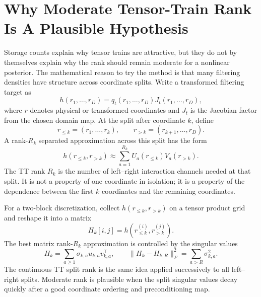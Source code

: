 \documentclass[11pt]{article}
\numberwithin{equation}{section}
\begin{document}
\section{Why Moderate Tensor-Train Rank Is A Plausible Hypothesis}

Storage counts explain why tensor trains are attractive, but they do not by
themselves explain why the rank should remain moderate for a nonlinear
posterior.  The mathematical reason to try the method is that many filtering
densities have structure across coordinate splits.  Write a transformed
filtering target as
\begin{equation}
    h(r_1,\ldots,r_D)
    =
    q_t(r_1,\ldots,r_D)
    J_t(r_1,\ldots,r_D),
    \label{eq:p24-rank-h}
\end{equation}
where \(r\) denotes physical or transformed coordinates and \(J_t\) is the
Jacobian factor from the chosen domain map.  At the split after coordinate
\(k\), define
\begin{equation}
    r_{\le k}=(r_1,\ldots,r_k),\qquad
    r_{>k}=(r_{k+1},\ldots,r_D).
    \label{eq:p24-rank-split}
\end{equation}
A rank-\(R_k\) separated approximation across this split has the form
\begin{equation}
    h(r_{\le k},r_{>k})
    \approx
    \sum_{a=1}^{R_k}
    U_a(r_{\le k})V_a(r_{>k}).
    \label{eq:p24-rank-separated}
\end{equation}
The TT rank \(R_k\) is the number of left--right interaction channels needed
at that split.  It is not a property of one coordinate in isolation; it is a
property of the dependence between the first \(k\) coordinates and the
remaining coordinates.

For a two-block discretization, collect \(h(r_{\le k},r_{>k})\) on a tensor
product grid and reshape it into a matrix
\begin{equation}
    H_k[i,j]
    =
    h(r_{\le k}^{(i)},r_{>k}^{(j)}).
    \label{eq:p24-rank-unfold}
\end{equation}
The best matrix rank-\(R_k\) approximation is controlled by the singular values
\begin{equation}
    H_k=\sum_{a\ge1}\sigma_{k,a}u_{k,a}v_{k,a}^{\top},
    \qquad
    \|H_k-H_{k,R}\|_F^2=\sum_{a>R}\sigma_{k,a}^2.
    \label{eq:p24-rank-svd}
\end{equation}
The continuous TT split rank is the same idea applied successively to all
left--right splits.  Moderate rank is plausible when the split singular values
decay quickly after a good coordinate ordering and preconditioning map.
\end{document}
